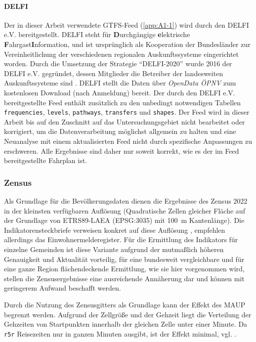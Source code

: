 \documentclass[11pt,pdftex,a4paper]{scrartcl}
\begin{document}
	\paragraph{DELFI} Der in dieser Arbeit verwendete GTFS-Feed (\ref{app:A1-1}) wird durch den DELFI e.V. bereitgestellt. DELFI steht für \textbf{D}urchgängige \textbf{e}lektrische \textbf{F}ahrgast\textbf{I}nformation, und ist ursprünglich als Kooperation der Bundesländer zur Vereinheitlichung der verschiedenen regionalen Auskunftssysteme eingerichtet worden. Durch die Umsetzung der Strategie \enquote{DELFI-2020} \parencite{delfi-lenkungsausschussStategieDELFI20202014} wurde 2016 der DELFI e.V. gegründet, dessen Mitglieder die Betreiber der landesweiten Auskunftssysteme sind \parencite{delfie.v.MitgliederDELFIEV}. DELFI stellt die Daten über \textit{OpenData ÖPNV} zum kostenlosen Download (nach Anmeldung) bereit. Der durch den DELFI e.V. bereitgestellte Feed enthält zusätzlich zu den unbedingt notwendigen Tabellen \texttt{frequencies}, \texttt{levels}, \texttt{pathways}, \texttt{transfers} und \texttt{shapes}. Der Feed wird in dieser Arbeit bis auf den Zuschnitt auf das Untersuchungsgebiet nicht bearbeitet oder korrigiert, um die Datenverarbeitung möglichst allgemein zu halten und eine Neuanalyse mit einem aktualisierten Feed nicht durch spezifische Anpassungen zu erschweren. Alle Ergebnisse sind daher nur soweit korrekt, wie es der im Feed bereitgestellte Fahrplan ist.

	\subsubsection{Zensus}
	Als Grundlage für die Bevölkerungsdaten dienen die Ergebnisse des Zensus 2022 in der kleinsten verfügbaren Auflösung (Quadratische Zellen gleicher Fläche auf der Grundlage von ETRS89-LAEA (EPSG:3035) mit \SI{100}{\metre} Kantenlänge). Die Indikatorensteckbriefe verweisen konkret auf diese Auflösung \parencite{bmdvIndikatorenLeichtGemacht2025}, empfehlen allerdings das Einwohnermelderegister. Für die Ermittlung des Indikators für einzelne Gemeinden ist diese Variante aufgrund der mutmaßlich höheren Genauigkeit und Aktualität vorteilig, für eine bundesweit vergleichbare und für eine ganze Region flächendeckende Ermittlung, wie sie hier vorgenommen wird, stellen die Zensusergebnisse eine ausreichende Annäherung dar und können mit geringerem Aufwand beschafft werden.
	
	Durch die Nutzung des Zensusgitters als Grundlage kann der Effekt des MAUP begrenzt werden. Aufgrund der Zellgröße und der Gehzeit liegt die Verteilung der Gehzeiten von Startpunkten innerhalb der gleichen Zelle unter einer Minute. Da \texttt{r5r} Reisezeiten nur in ganzen Minuten ausgibt, ist der Effekt minimal, vgl. \textcite[8]{conwayEvidenceBasedTransitLand2017}.
	
\end{document}
